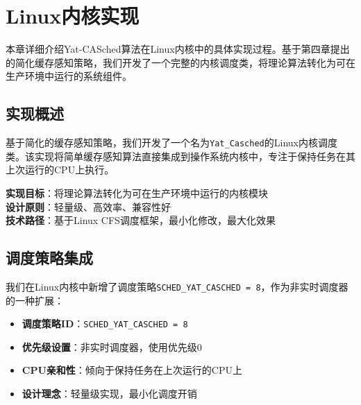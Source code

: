 
\newpage
\section{Linux内核实现} \label{sec:kernel}

本章详细介绍Yat-CASched算法在Linux内核中的具体实现过程。基于第四章提出的简化缓存感知策略，我们开发了一个完整的内核调度类，将理论算法转化为可在生产环境中运行的系统组件。

\subsection{实现概述}

基于简化的缓存感知策略，我们开发了一个名为\texttt{Yat\_Casched}的Linux内核调度类。该实现将简单缓存感知算法直接集成到操作系统内核中，专注于保持任务在其上次运行的CPU上执行。

\begin{tcolorbox}[
    colback=blue!5!white,
    colframe=blue!50!black,
    title=\textbf{内核实现核心目标},
    fonttitle=\bfseries,
    arc=3pt
]
\textbf{实现目标}：将理论算法转化为可在生产环境中运行的内核模块\\
\textbf{设计原则}：轻量级、高效率、兼容性好\\
\textbf{技术路径}：基于Linux CFS调度框架，最小化修改，最大化效果
\end{tcolorbox}

\subsection{调度策略集成}

我们在Linux内核中新增了调度策略\texttt{SCHED\_YAT\_CASCHED = 8}，作为非实时调度器的一种扩展：

\begin{tcolorbox}[
    colback=lightgreen!10!white,
    colframe=green!50!black,
    title=\textbf{调度策略参数配置},
    fonttitle=\bfseries,
    arc=3pt
]
\begin{itemize}
    \item \textbf{调度策略ID}：\texttt{SCHED\_YAT\_CASCHED = 8}
    \item \textbf{优先级设置}：非实时调度器，使用优先级0
    \item \textbf{CPU亲和性}：倾向于保持任务在上次运行的CPU上
    \item \textbf{设计理念}：轻量级实现，最小化调度开销
\end{itemize}
\end{tcolorbox}

